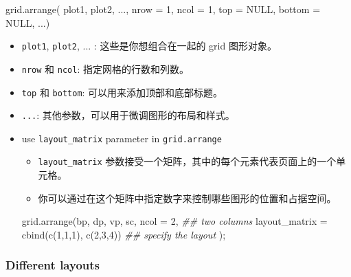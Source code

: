 \documentclass[
]{article}
\newenvironment{Shaded}{}{}
\newcommand{\AttributeTok}[1]{\textcolor[rgb]{0.49,0.56,0.16}{#1}}
\newcommand{\ConstantTok}[1]{\textcolor[rgb]{0.53,0.00,0.00}{#1}}
\newcommand{\DecValTok}[1]{\textcolor[rgb]{0.25,0.63,0.44}{#1}}
\newcommand{\DocumentationTok}[1]{\textcolor[rgb]{0.73,0.13,0.13}{\textit{#1}}}
\newcommand{\FunctionTok}[1]{\textcolor[rgb]{0.02,0.16,0.49}{#1}}
\newcommand{\NormalTok}[1]{#1}
\begin{document}
\begin{Shaded}
\begin{Highlighting}[]
\FunctionTok{grid.arrange}\NormalTok{(}
\NormalTok{    plot1, plot2,}
\NormalTok{    ..., }
    \AttributeTok{nrow =} \DecValTok{1}\NormalTok{, }
    \AttributeTok{ncol =} \DecValTok{1}\NormalTok{, }
    \AttributeTok{top =} \ConstantTok{NULL}\NormalTok{,}
    \AttributeTok{bottom =} \ConstantTok{NULL}\NormalTok{, }
\NormalTok{    ...)}
\end{Highlighting}
\end{Shaded}

\begin{itemize}
\item
  \texttt{plot1}, \texttt{plot2}, ... : 这些是你想组合在一起的 grid
  图形对象。
\item
  \texttt{nrow} 和 \texttt{ncol}: 指定网格的行数和列数。
\item
  \texttt{top} 和 \texttt{bottom}: 可以用来添加顶部和底部标题。
\item
  \texttt{...}: 其他参数，可以用于微调图形的布局和样式。
\item
  use \texttt{layout\_matrix} parameter in \texttt{grid.arrange}

  \begin{itemize}
  \item
    \texttt{layout\_matrix}
    参数接受一个矩阵，其中的每个元素代表页面上的一个单元格。
  \item
    你可以通过在这个矩阵中指定数字来控制哪些图形的位置和占据空间。
  \end{itemize}

\begin{Shaded}
\begin{Highlighting}[]
\FunctionTok{grid.arrange}\NormalTok{(bp, dp, vp, sc, }
             \AttributeTok{ncol =} \DecValTok{2}\NormalTok{,  }\DocumentationTok{\#\# two columns }
             \AttributeTok{layout\_matrix =} \FunctionTok{cbind}\NormalTok{(}\FunctionTok{c}\NormalTok{(}\DecValTok{1}\NormalTok{,}\DecValTok{1}\NormalTok{,}\DecValTok{1}\NormalTok{), }\FunctionTok{c}\NormalTok{(}\DecValTok{2}\NormalTok{,}\DecValTok{3}\NormalTok{,}\DecValTok{4}\NormalTok{)) }\DocumentationTok{\#\# specify the layout}
\NormalTok{             );}
\end{Highlighting}
\end{Shaded}
\end{itemize}

\hypertarget{different-layouts}{%
\subsubsection{Different layouts}\label{different-layouts}}
\end{document}
